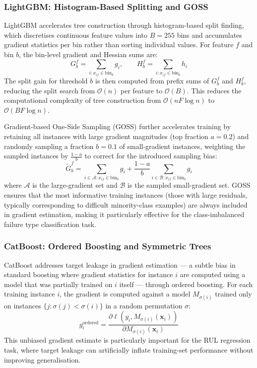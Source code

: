 \subsubsection{LightGBM: Histogram-Based Splitting and GOSS}

LightGBM accelerates tree construction through histogram-based split finding, which discretises continuous feature values into $B = 255$ bins and accumulates gradient statistics per bin rather than sorting individual values. For feature $f$ and bin $b$, the bin-level gradient and Hessian sums are:
\begin{equation}
    G_b^f = \sum_{i: x_{if} \in \text{bin}_b} g_i, \qquad H_b^f = \sum_{i: x_{if} \in \text{bin}_b} h_i
    \label{eq:lgbm_hist}
\end{equation}
The split gain for threshold $b$ is then computed from prefix sums of $G_b^f$ and $H_b^f$, reducing the split search from $\mathcal{O}(n)$ per feature to $\mathcal{O}(B)$. This reduces the computational complexity of tree construction from $\mathcal{O}(nF\log n)$ to $\mathcal{O}(BF\log n)$.

Gradient-based One-Side Sampling (GOSS) further accelerates training by retaining all instances with large gradient magnitudes (top fraction $a = 0.2$) and randomly sampling a fraction $b = 0.1$ of small-gradient instances, weighting the sampled instances by $\frac{1-a}{b}$ to correct for the introduced sampling bias:
\begin{equation}
    \tilde{G}_b^f = \sum_{i \in \mathcal{A}: x_{if} \in \text{bin}_b} g_i +
                   \frac{1-a}{b} \sum_{i \in \mathcal{B}: x_{if} \in \text{bin}_b} g_i
    \label{eq:goss}
\end{equation}
where $\mathcal{A}$ is the large-gradient set and $\mathcal{B}$ is the sampled small-gradient set. GOSS ensures that the most informative training instances (those with large residuals, typically corresponding to difficult minority-class examples) are always included in gradient estimation, making it particularly effective for the class-imbalanced failure type classification task.

\subsubsection{CatBoost: Ordered Boosting and Symmetric Trees}

CatBoost addresses target leakage in gradient estimation --- a subtle bias in standard boosting where gradient statistics for instance $i$ are computed using a model that was partially trained on $i$ itself --- through ordered boosting. For each training instance $i$, the gradient is computed against a model $M_{\sigma(i)}$ trained only on instances $\{j : \sigma(j) < \sigma(i)\}$ in a random permutation $\sigma$:
\begin{equation}
    g_i^{\text{ordered}} = \frac{\partial \ell(y_i, M_{\sigma(i)}(\mathbf{x}_i))}{\partial M_{\sigma(i)}(\mathbf{x}_i)}
    \label{eq:catboost_ordered}
\end{equation}
This unbiased gradient estimate is particularly important for the RUL regression task, where target leakage can artificially inflate training-set performance without improving generalisation.

